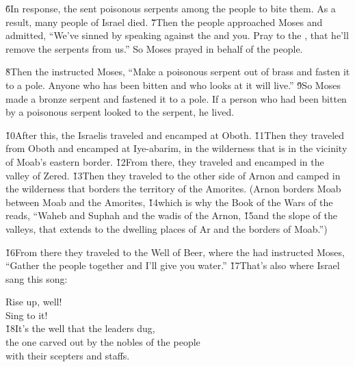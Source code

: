 \v{6}In response, the  sent poisonous serpents among the people to bite them. As a result, many people of Israel died. \v{7}Then the people approached Moses and admitted, ``We've sinned by speaking against the  and you. Pray to the , that he'll remove the serpents from us.'' So Moses prayed in behalf of the people.

\v{8}Then the  instructed Moses, ``Make a poisonous serpent out of brass and fasten it to a pole. Anyone who has been bitten and who looks at it will live.'' \v{9}So Moses made a bronze serpent and fastened it to a pole. If a person who had been bitten by a poisonous serpent looked to the serpent, he lived.

\v{10}After this, the Israelis traveled and encamped at Oboth. \v{11}Then they traveled from Oboth and encamped at Iye-abarim, in the wilderness that is in the vicinity of Moab's eastern border. \v{12}From there, they traveled and encamped in the valley of Zered. \v{13}Then they traveled to the other side of Arnon and camped in the wilderness that borders the territory of the Amorites. (Arnon borders Moab between Moab and the Amorites, \v{14}which is why the Book of the Wars of the  reads, ``Waheb and Suphah and the wadis of the Arnon, \v{15}and the slope of the valleys, that extends to the dwelling places of Ar and the borders of Moab.'')

\v{16}From there they traveled to the Well of Beer, where the  had instructed Moses, ``Gather the people together and I'll give you water.'' \v{17}That's also where Israel sang this song:

\begin{poetry}
\poeml Rise up, well! \\
\poemll    Sing to it! \\
\poeml \v{18}It's the well that the leaders dug, \\
\poemll    the one carved out by the nobles of the people \\
\poemlll       with their scepters and staffs.
\end{poetry}

